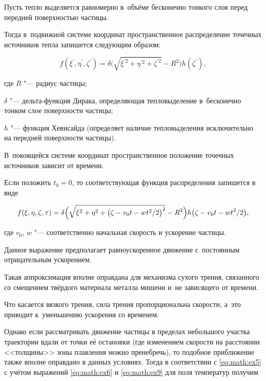 Пусть тепло выделяется равномерно в~объёме бесконечно тонкого слоя перед передней поверхностью частицы. 

Тогда в~подвижной системе координат пространственное распределение  точечных источников тепла запишется следующим образом:

  \begin{equation}\label{eq:math:ex8}

 f(\xi^{\prime},\eta^{\prime},\zeta^{\prime})= \delta\bigl(\sqrt{\xi^{\prime2}+\eta^{\prime2}+\zeta^{\prime2}}-R^{2}\bigr)h(\zeta^{\prime}),

\end{equation}

где $R $ "--- радиус частицы; 

$\delta $ "--- дельта-функция Дирака, определяющая тепловыделение в~бесконечно тонком слое поверхности частицы; 

$h $ "--- функция Хевисайда (определяет наличие тепловыделения исключительно на передней поверхности частицы). 

В~покоящейся системе координат пространственное положение точечных источников зависит от времени. 

Если положить $t_{0}=0 $, то соответствующая функция распределения запишется в виде

 \begin{equation}

 \label{eq:math:ex9}

 f(\xi,\eta,\zeta,\tau)=\delta\Bigl(\sqrt{\xi^{2}+\eta^{2}+\bigl(\zeta-v_{0}t-{wt^{2}}/{2}\bigr)^{2}}-R^{2}\Bigr)h\bigl(\zeta-v_{0}t-{wt^{2}}/{2}\bigr),

\end{equation}

где $v_{0}$, $w$ "--- соответственно начальная скорость и ускорение частицы. 

Данное выражение предполагает равноускоренное движение с~постоянным отрицательным ускорением. 

Такая аппроксимация вполне оправдана для механизма сухого трения, связанного со смещением твёрдого материала металла мишени и~не зависящего от времени. 

Что касается вязкого трения, сила трения пропорциональна скорости, а~это приводит к~уменьшению ускорения со временем. 

Однако если рассматривать движение частицы в пределах небольшого участка траектории вдали от точки её остановки (где изменением скорости на расстоянии <<толщины>> зоны плавления можно пренебречь), то подобное приближение также вполне оправдано в данных условиях. Тогда в соответствии с \eqref{eq:math:ex5}  с учётом выражений \eqref{eq:math:ex6} и \eqref{eq:math:ex9} для поля температур получим

